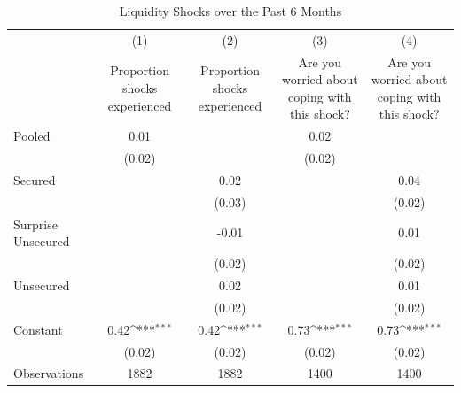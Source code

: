 \begin{table}[htbp]\centering
\def\sym#1{\ifmmode^{#1}\else\(^{#1}\)\fi}
\caption{Liquidity Shocks over the Past 6 Months\label{shock\_A}}
\begin{tabular}{l*{4}{c}}
\toprule
                    &\multicolumn{1}{c}{(1)}&\multicolumn{1}{c}{(2)}&\multicolumn{1}{c}{(3)}&\multicolumn{1}{c}{(4)}\\
                    &\multicolumn{1}{c}{Proportion shocks experienced}&\multicolumn{1}{c}{Proportion shocks experienced}&\multicolumn{1}{c}{Are you worried about coping with this shock?}&\multicolumn{1}{c}{Are you worried about coping with this shock?}\\
\midrule
Pooled              &        0.01         &                     &        0.02         &                     \\
                    &      (0.02)         &                     &      (0.02)         &                     \\\addlinespace
Secured             &                     &        0.02         &                     &        0.04         \\
                    &                     &      (0.03)         &                     &      (0.02)         \\\addlinespace
Surprise Unsecured  &                     &       -0.01         &                     &        0.01         \\
                    &                     &      (0.02)         &                     &      (0.02)         \\\addlinespace
Unsecured           &                     &        0.02         &                     &        0.01         \\
                    &                     &      (0.02)         &                     &      (0.02)         \\\addlinespace
Constant            &        0.42\sym{***}&        0.42\sym{***}&        0.73\sym{***}&        0.73\sym{***}\\
                    &      (0.02)         &      (0.02)         &      (0.02)         &      (0.02)         \\
\midrule
Observations        &        1882         &        1882         &        1400         &        1400         \\
\bottomrule
\end{tabular}
\end{table}
